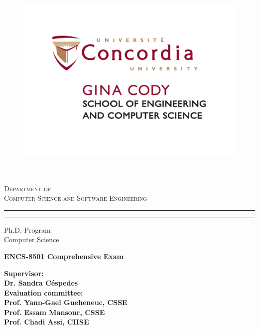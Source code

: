 \begin{titlepage}
\begin{spacing}{1.4}
%
\begin{figure}[ht]
\centering
\includegraphics[height=100mm]{FIGURES/logoConcordia.pdf}
\end{figure}
%
\begin{center}
{\scshape \Large
Department of \\ Computer Science and Software Engineering 
}

\vspace{5mm}

\rule{100mm}{0.1mm}
\rule[5mm]{100mm}{0.4mm}

{\large 
Ph.D. Program \\ 
{Computer Science}
}

\vspace{12mm}

\begin{spacing}{2.0}
{\huge \bf ENCS-8501 Comprehensive Exam}
\end{spacing}

\end{center}

\vspace{8mm}
\noindent
\begin{minipage}[t]{0.5\textwidth}
\bf Supervisor:\\
Dr. Sandra Céspedes\\
 
Evaluation committee:\\
Prof. Yann-Gael Gueheneuc, CSSE \\
Prof. Essam Mansour, CSSE\\
Prof. Chadi Assi, CIISE\\


\end{minipage}
\end{spacing}
\end{titlepage}
